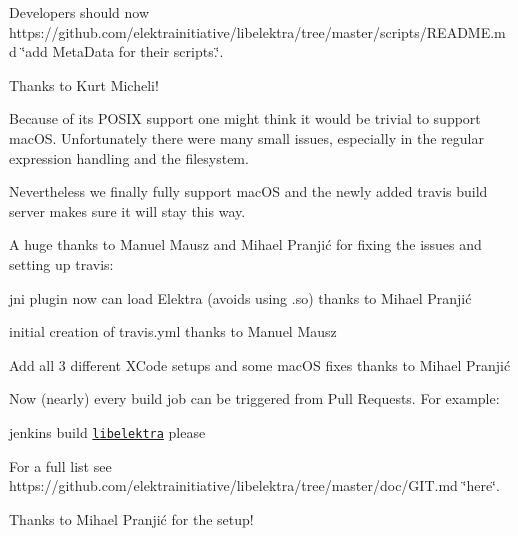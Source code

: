 Developers should now https\+://github.com/elektrainitiative/libelektra/tree/master/scripts/\+R\+E\+A\+D\+M\+E.\+md \char`\"{}add Meta\+Data for their scripts.\char`\"{}.

Thanks to Kurt Micheli!

Because of its P\+O\+S\+IX support one might think it would be trivial to support mac\+OS. Unfortunately there were many small issues, especially in the regular expression handling and the filesystem.

Nevertheless we finally fully support mac\+OS and the newly added travis build server makes sure it will stay this way.

A huge thanks to Manuel Mausz and Mihael Pranjić for fixing the issues and setting up travis\+:


\begin{DoxyItemize}
\item jni plugin now can load Elektra (avoids using {\ttfamily .so}) thanks to Mihael Pranjić
\item initial creation of travis.\+yml thanks to Manuel Mausz
\item Add all 3 different X\+Code setups and some mac\+OS fixes thanks to Mihael Pranjić
\end{DoxyItemize}

Now (nearly) every build job can be triggered from Pull Requests. For example\+:


\begin{DoxyItemize}
\item jenkins build \href{https://build.libelektra.org/job/libelektra/}{\tt libelektra} please
\end{DoxyItemize}

For a full list see https\+://github.com/elektrainitiative/libelektra/tree/master/doc/\+G\+I\+T.\+md \char`\"{}here\char`\"{}.

Thanks to Mihael Pranjić for the setup!


